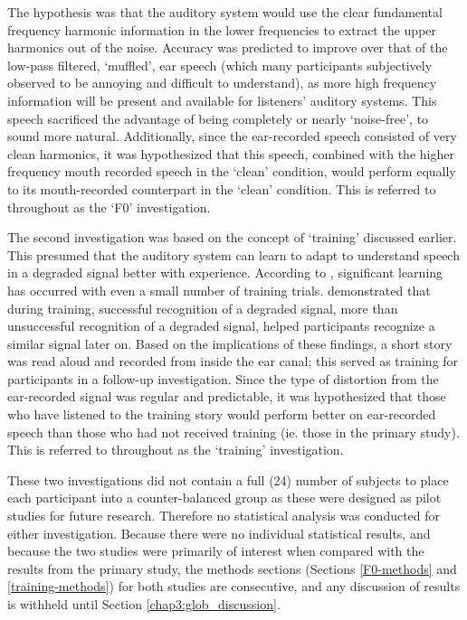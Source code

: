 The hypothesis was that the auditory system would use the clear fundamental frequency harmonic information in the lower frequencies to extract the upper harmonics out of the noise.  Accuracy was predicted to improve over that of the low-pass filtered, `muffled', ear speech (which many participants subjectively observed to be annoying and difficult to understand), as more high frequency information will be present and available for listeners' auditory systems.  This speech sacrificed the advantage of being completely or nearly `noise-free', to sound more natural.  Additionally, since the ear-recorded speech consisted of very clean harmonics, it was hypothesized that this speech, combined with the higher frequency mouth recorded speech in the `clean' condition, would perform equally to its mouth-recorded counterpart in the `clean' condition. This is referred to throughout as the `F0' investigation.

The second investigation was based on the concept of `training' discussed earlier.  This presumed that the auditory system can learn to adapt to understand speech in a degraded signal better with experience.  According to \cite{mattys:12}, significant learning has occurred with even a small number of training trials.  \cite{davis:05} demonstrated that during training, successful recognition of a degraded signal, more than unsuccessful recognition of a degraded signal, helped participants recognize a similar signal later on.  
Based on the implications of these findings, a short story was read aloud and recorded from inside the ear canal; this served as training for participants in a follow-up investigation.  Since the type of distortion from the ear-recorded signal was regular and predictable, it was hypothesized that those who have listened to the training story would perform better on ear-recorded speech than those who had not received training (ie. those in the primary study). This is referred to throughout as the `training' investigation.

These two investigations did not contain a full (24) number of subjects to place each participant into a counter-balanced group as these were designed as pilot studies for future research.  Therefore no statistical analysis was conducted for either investigation.  %
Because there were no individual statistical results, and because the two studies were primarily of interest when compared with the results from the primary study, the methods sections (Sections \ref{F0-methods} and \ref{training-methods}) for both studies are consecutive, and any discussion of results is withheld until Section \ref{chap3:glob_discussion}.

